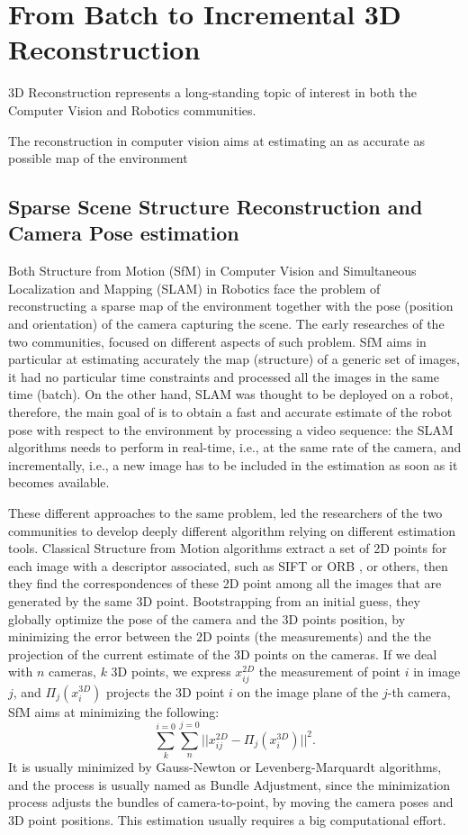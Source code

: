 \chapter{From Batch to Incremental 3D Reconstruction}

3D Reconstruction represents a long-standing topic of interest in both the Computer Vision and Robotics communities.



The reconstruction in computer vision aims at estimating an as accurate as possible map of the environment


\section{Sparse Scene Structure Reconstruction and Camera Pose estimation}
Both Structure from Motion (SfM) in Computer Vision and Simultaneous Localization and Mapping (SLAM) in Robotics face the problem of reconstructing a sparse map of the environment together with the pose (position and orientation) of the camera capturing the scene.
The early researches of the two communities, focused on different aspects of such problem.
SfM aims in particular at  estimating accurately the map (structure) of a generic set of images, it had no particular time constraints and processed all the images in the same time (batch).
On the other hand, SLAM was thought to be deployed on a robot, therefore, the main goal of is to obtain a fast and accurate estimate of the robot pose with respect to the environment by processing a video sequence: the SLAM algorithms needs to perform in real-time, i.e., at the same rate of the camera, and incrementally, i.e., a new image  has to be included in the estimation as soon as it becomes available.


These different approaches to the same problem, led the researchers of the two communities to develop deeply different algorithm relying on different estimation tools.
Classical Structure from Motion algorithms \cite{triggs2000bundle,sibley2009adaptive,wu2011multicore} extract a set of 2D points for each image with a descriptor associated, such as SIFT \cite{sift} or ORB \cite{orb}, or others, then they find the correspondences of these 2D point among all the images that are generated by the same 3D point. Bootstrapping from an initial guess, they globally optimize the pose of the camera and the 3D points position, by minimizing the error between the 2D points (the measurements) and the the projection of the current estimate of the 3D points on the cameras.
If we deal with $n$ cameras, $k$ 3D points, we express $x_{ij}^{2D}$ the measurement of point $i$ in image $j$, and $\Pi_j(x_i^{3D})$ projects the 3D point $i$ on the image plane of the $j$-th camera, SfM aims at minimizing the following:
\[
\sum_{k}^{i=0}\sum_{n}^{j=0}||x_{ij}^{2D} - \Pi_j(x_i^{3D})||^2.
\]
It is usually minimized by Gauss-Newton or Levenberg-Marquardt algorithms, and the process is usually named as Bundle Adjustment, since the minimization process adjusts the bundles of camera-to-point, by moving the camera poses and 3D point positions. This estimation usually requires a big computational effort.


